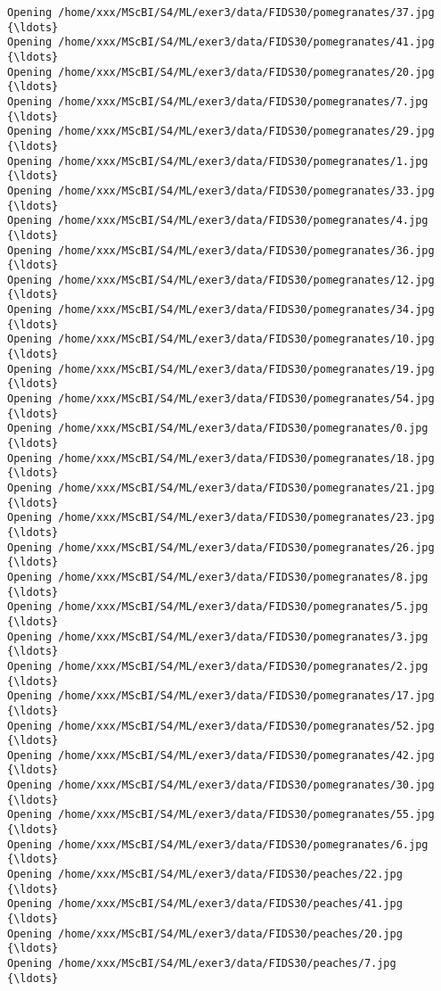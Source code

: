 \documentclass[11pt]{article}
\begin{document}
    \begin{Verbatim}[commandchars=\\\{\}]
Opening /home/xxx/MScBI/S4/ML/exer3/data/FIDS30/pomegranates/37.jpg  {\ldots}
Opening /home/xxx/MScBI/S4/ML/exer3/data/FIDS30/pomegranates/41.jpg  {\ldots}
Opening /home/xxx/MScBI/S4/ML/exer3/data/FIDS30/pomegranates/20.jpg  {\ldots}
Opening /home/xxx/MScBI/S4/ML/exer3/data/FIDS30/pomegranates/7.jpg  {\ldots}
Opening /home/xxx/MScBI/S4/ML/exer3/data/FIDS30/pomegranates/29.jpg  {\ldots}
Opening /home/xxx/MScBI/S4/ML/exer3/data/FIDS30/pomegranates/1.jpg  {\ldots}
Opening /home/xxx/MScBI/S4/ML/exer3/data/FIDS30/pomegranates/33.jpg  {\ldots}
Opening /home/xxx/MScBI/S4/ML/exer3/data/FIDS30/pomegranates/4.jpg  {\ldots}
Opening /home/xxx/MScBI/S4/ML/exer3/data/FIDS30/pomegranates/36.jpg  {\ldots}
Opening /home/xxx/MScBI/S4/ML/exer3/data/FIDS30/pomegranates/12.jpg  {\ldots}
Opening /home/xxx/MScBI/S4/ML/exer3/data/FIDS30/pomegranates/34.jpg  {\ldots}
Opening /home/xxx/MScBI/S4/ML/exer3/data/FIDS30/pomegranates/10.jpg  {\ldots}
Opening /home/xxx/MScBI/S4/ML/exer3/data/FIDS30/pomegranates/19.jpg  {\ldots}
Opening /home/xxx/MScBI/S4/ML/exer3/data/FIDS30/pomegranates/54.jpg  {\ldots}
Opening /home/xxx/MScBI/S4/ML/exer3/data/FIDS30/pomegranates/0.jpg  {\ldots}
Opening /home/xxx/MScBI/S4/ML/exer3/data/FIDS30/pomegranates/18.jpg  {\ldots}
Opening /home/xxx/MScBI/S4/ML/exer3/data/FIDS30/pomegranates/21.jpg  {\ldots}
Opening /home/xxx/MScBI/S4/ML/exer3/data/FIDS30/pomegranates/23.jpg  {\ldots}
Opening /home/xxx/MScBI/S4/ML/exer3/data/FIDS30/pomegranates/26.jpg  {\ldots}
Opening /home/xxx/MScBI/S4/ML/exer3/data/FIDS30/pomegranates/8.jpg  {\ldots}
Opening /home/xxx/MScBI/S4/ML/exer3/data/FIDS30/pomegranates/5.jpg  {\ldots}
Opening /home/xxx/MScBI/S4/ML/exer3/data/FIDS30/pomegranates/3.jpg  {\ldots}
Opening /home/xxx/MScBI/S4/ML/exer3/data/FIDS30/pomegranates/2.jpg  {\ldots}
Opening /home/xxx/MScBI/S4/ML/exer3/data/FIDS30/pomegranates/17.jpg  {\ldots}
Opening /home/xxx/MScBI/S4/ML/exer3/data/FIDS30/pomegranates/52.jpg  {\ldots}
Opening /home/xxx/MScBI/S4/ML/exer3/data/FIDS30/pomegranates/42.jpg  {\ldots}
Opening /home/xxx/MScBI/S4/ML/exer3/data/FIDS30/pomegranates/30.jpg  {\ldots}
Opening /home/xxx/MScBI/S4/ML/exer3/data/FIDS30/pomegranates/55.jpg  {\ldots}
Opening /home/xxx/MScBI/S4/ML/exer3/data/FIDS30/pomegranates/6.jpg  {\ldots}
Opening /home/xxx/MScBI/S4/ML/exer3/data/FIDS30/peaches/22.jpg  {\ldots}
Opening /home/xxx/MScBI/S4/ML/exer3/data/FIDS30/peaches/41.jpg  {\ldots}
Opening /home/xxx/MScBI/S4/ML/exer3/data/FIDS30/peaches/20.jpg  {\ldots}
Opening /home/xxx/MScBI/S4/ML/exer3/data/FIDS30/peaches/7.jpg  {\ldots}

\end{Verbatim}
\end{document}
